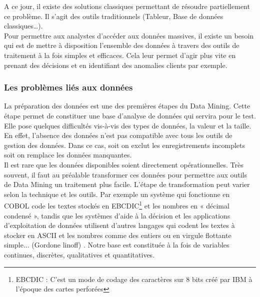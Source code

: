\documentclass[11pt,a4paper]{report}
\begin{document}
%
%
%

A ce jour, il existe des solutions classiques permettant de résoudre partiellement ce problème. Il s’agit des outils traditionnels (Tableur, Base de données classiques…).\\

Pour permettre aux analystes d’accéder aux données massives, il existe un besoin qui est de mettre à disposition l'ensemble des données à travers des outils de traitement à la fois simples et efficaces. Cela leur permet d’agir plus vite en prenant des décisions et en identifiant des anomalies clients par exemple. \newline

\subsubsection{Les problèmes liés aux données}
La préparation des données est une des premières étapes du Data Mining. Cette étape permet de constituer une base d'analyse de données qui servira pour le test. Elle pose quelques difficultés vis-à-vis des types de données, la valeur et la taille.
En effet, l'absence des données n'est pas compatible avec tous les outils de gestion des données. Dans ce cas, soit on exclut les enregistrements incomplets soit on remplace les données manquantes.\\ 
Il est rare que les données disponibles soient directement opérationnelles. Très souvent, il faut au préalable transformer ces données pour permettre aux outils de Data Mining un traitement plus facile. L’étape de transformation peut varier selon la technique et les outils. Par exemple un système qui fonctionne en COBOL code les textes stockés en EBCDIC\footnote {EBCDIC : C'est un mode de codage des caractères sur 8 bits créé par IBM à l'époque des cartes perforées} et les nombres en « décimal condensé », tandis que les systèmes d’aide à la décision et les applications d’exploitation de données utilisent d’autres langages qui codent les textes à stocker en ASCII et les nombres comme des entiers ou en virgule flottante simple... (Gordone linoff) \cite{concepts}. Notre base est constituée à la fois de variables continues, discrètes, qualitatives et quantitatives.\\
\end{document}
